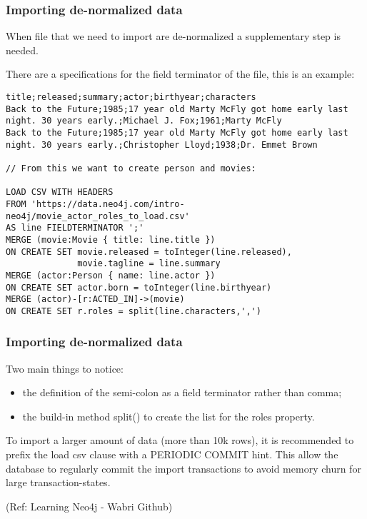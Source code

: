\begin{frame}[fragile]\frametitle{Importing de-normalized data}
When file that we need to import are de-normalized a supplementary step is needed.


There are a specifications for the field terminator of the file, this is an example:

\begin{lstlisting}
title;released;summary;actor;birthyear;characters
Back to the Future;1985;17 year old Marty McFly got home early last night. 30 years early.;Michael J. Fox;1961;Marty McFly
Back to the Future;1985;17 year old Marty McFly got home early last night. 30 years early.;Christopher Lloyd;1938;Dr. Emmet Brown

// From this we want to create person and movies:

LOAD CSV WITH HEADERS
FROM 'https://data.neo4j.com/intro-neo4j/movie_actor_roles_to_load.csv'
AS line FIELDTERMINATOR ';'
MERGE (movie:Movie { title: line.title })
ON CREATE SET movie.released = toInteger(line.released),
              movie.tagline = line.summary
MERGE (actor:Person { name: line.actor })
ON CREATE SET actor.born = toInteger(line.birthyear)
MERGE (actor)-[r:ACTED_IN]->(movie)
ON CREATE SET r.roles = split(line.characters,',')
\end{lstlisting}


\end{frame}

\begin{frame}[fragile]\frametitle{Importing de-normalized data}

Two main things to notice:

\begin{itemize}
\item the definition of the semi-colon as a field terminator rather than comma;
\item the build-in method split() to create the list for the roles property.
\end{itemize}

To import a larger amount of data (more than 10k rows), it is recommended to prefix the load csv clause with a PERIODIC COMMIT hint. This allow the database to regularly commit the import transactions to avoid memory churn for large transaction-states.

{\tiny (Ref: Learning Neo4j - Wabri Github)}

\end{frame}
